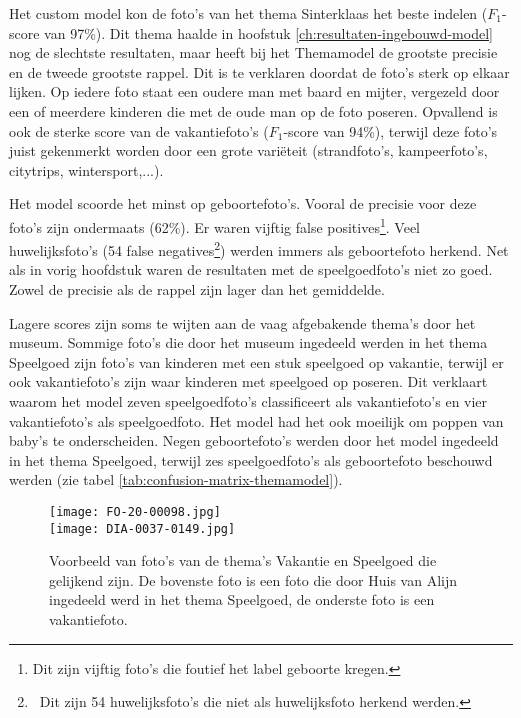 Het custom model kon de foto's van het thema Sinterklaas het beste indelen ($F_1$-score van 97\%). Dit thema haalde in hoofstuk \ref{ch:resultaten-ingebouwd-model} nog de slechtste resultaten, maar heeft bij het Themamodel de grootste precisie en de tweede grootste rappel. Dit is te verklaren doordat de foto’s sterk op elkaar lijken. Op iedere foto staat een oudere man met baard en mijter, vergezeld door een of meerdere kinderen die met de oude man op de foto poseren. Opvallend is ook de sterke score van de vakantiefoto’s ($F_1$-score van 94\%), terwijl deze foto’s juist gekenmerkt worden door een grote variëteit (strandfoto’s, kampeerfoto’s, citytrips, wintersport,...).

Het model scoorde het minst op geboortefoto’s. Vooral de precisie voor deze foto’s zijn ondermaats (62\%). Er waren vijftig false positives\footnote{Dit zijn vijftig foto's die foutief het label geboorte kregen.}. Veel huwelijksfoto’s (54 false negatives\footnote{~Dit zijn 54 huwelijksfoto's die niet als huwelijksfoto herkend werden.}) werden immers als geboortefoto herkend.  Net als in vorig hoofdstuk waren de resultaten met de speelgoedfoto’s niet zo goed. Zowel de precisie als de rappel zijn lager dan het gemiddelde.

Lagere scores zijn soms te wijten aan de vaag afgebakende thema’s door het museum. Sommige foto’s die door het museum ingedeeld werden in het thema Speelgoed zijn foto’s van kinderen met een stuk speelgoed op vakantie, terwijl er ook vakantiefoto’s zijn waar kinderen met speelgoed op poseren. Dit verklaart waarom het model zeven speelgoedfoto’s classificeert als vakantiefoto’s en vier vakantiefoto’s als speelgoedfoto. Het model had het ook moeilijk om poppen van baby’s te onderscheiden. Negen geboortefoto’s werden door het model ingedeeld in het thema Speelgoed, terwijl zes speelgoedfoto’s als geboortefoto beschouwd werden (zie tabel \ref{tab:confusion-matrix-themamodel}).

\begin{figure}
	\centering
	\texttt{[image: FO-20-00098.jpg]}\hfill
	\\[\smallskipamount]
	\texttt{[image: DIA-0037-0149.jpg]}\hfill
	\caption[Voorbeeld van foto's van de thema's Vakantie en Speelgoed die gelijkend zijn]{Voorbeeld van foto's van de thema's Vakantie en Speelgoed die gelijkend zijn. De bovenste foto is een foto die door Huis van Alijn ingedeeld werd in het thema Speelgoed, de onderste foto is een vakantiefoto.}
\end{figure}

